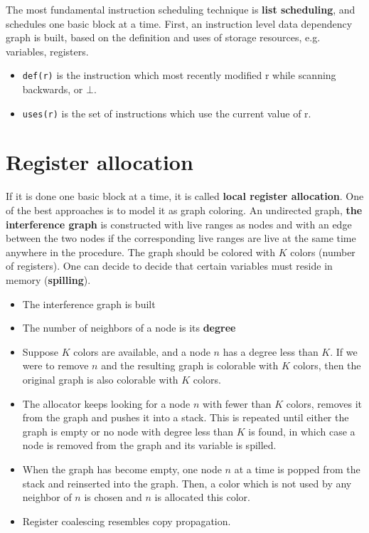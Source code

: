 \documentclass[a4paper,12pt, notitlepage]{article}
\begin{document}
The most fundamental instruction scheduling technique is \textbf{list
scheduling}, and schedules one basic block at a time.
First, an instruction level data dependency graph is built, based on the
definition and uses of storage resources, e.g. variables, registers.
\begin{itemize}
\item \texttt{def(r)} is the instruction which most recently modified r while
scanning backwards, or $\bot$.
\item \texttt{uses(r)} is the set of instructions which use the current value of
r.
\end{itemize}

\section*{Register allocation}
If it is done one basic block at a time, it is called \textbf{local register
allocation}.
One of the best approaches is to model it as graph coloring.
An undirected graph, \textbf{the interference graph} is constructed with live
ranges as nodes and with an edge between the two nodes if the corresponding live
ranges are live at the same time anywhere in the procedure. The graph should be
colored with $K$ colors (number of registers).
One can decide to decide that certain variables must reside in memory
(\textbf{spilling}).

\begin{itemize}
\item The interference graph is built
\item The number of neighbors of a node is its \textbf{degree}
\item Suppose $K$ colors are available, and a node $n$ has a degree less than
$K$. If we were to remove $n$ and the resulting graph is colorable with $K$
colors, then the original graph is also colorable with $K$ colors.
\item The allocator keeps looking for a node $n$ with fewer than $K$ colors,
removes it from the graph and pushes it into a stack. This is repeated until
either the graph is empty or no node with degree less than $K$ is found, in
which case a node is removed from the graph and its variable is spilled.
\item When the graph has become empty, one node $n$ at a time is popped from the
stack and reinserted into the graph. Then, a color which is not used by any
neighbor of $n$ is chosen and $n$ is allocated this color.
\item Register coalescing resembles copy propagation.

\end{itemize}
\end{document}

